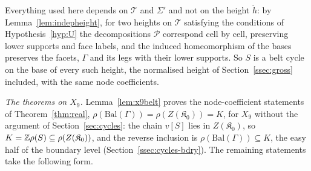 Everything used here depends on $\mathcal T$ and $\Sigma'$ and not on the height $\check h$: by
Lemma~\ref{lem:indepheight}, for two heights on $\mathcal T$ satisfying the conditions of Hypothesis~\ref{hyp:U} the
decompositions $\mathscr P$ correspond cell by cell, preserving lower supports and face labels, and the induced
homeomorphism of the bases preserves the facets, $\Gamma$ and its legs with their lower supports. So $S$ is a belt cycle
on the base of every such height, the normalised height of Section~\ref{ssec:gross} included, with the same node
coefficients.

\emph{The theorems on $X_9$.} Lemma~\ref{lem:x9belt} proves the node-coefficient statements of Theorem~\ref{thm:real},
$\rho(\mathrm{Bal}(\Gamma))=\rho(Z(\mathfrak K_0))=K$, for $X_9$ without the argument of Section~\ref{sec:cycles}: the chain $v[S]$ lies in $Z(\mathfrak K_0)$, so $K=\mathbb Z\rho(S)\subseteq\rho(Z(\mathfrak K_0))$, and the
reverse inclusion is $\rho(\mathrm{Bal}(\Gamma))\subseteq K$, the easy half of the boundary level
(Section~\ref{ssec:cycles-bdry}). The remaining statements take the following
form.
